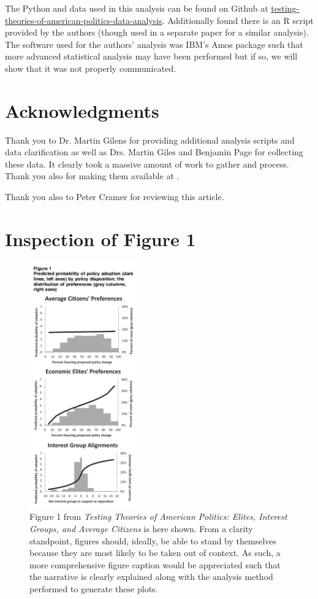 \documentclass[]{article}
\begin{document}
The Python and data used in this analysis can be found on Github at \href{https://github.com/ChemistryMickey/testing-theories-of-american-politics-data-analysis}{testing-theories-of-american-politics-data-analysis}. Additionally found there is an R script provided by the authors (though used in a separate paper for a similar analysis). The software used for the authors' analysis was IBM's Amos package such that more advanced statistical analysis may have been performed but if so, we will show that it was not properly communicated.

\section{Acknowledgments}
Thank you to Dr. Martin Gilens for providing additional analysis scripts and data clarification as well as Drs. Martin Giles and Benjamin Page for collecting these data. 
It clearly took a massive amount of work to gather and process.
Thank you also for making them available at \cite{gilens}.

Thank you also to Peter Cramer for reviewing this article.

\section{Inspection of Figure 1}

\begin{figure}[H]
	\begin{center}
		\includegraphics[height=400px]{./figures/figure1.png}
	\end{center}	
	\caption{Figure 1 from \textit{Testing Theories of American Politics: Elites, Interest Groups, and Average Citizens} is here shown. From a clarity standpoint, figures should, ideally, be able to stand by themselves because they are most likely to be taken out of context. As such, a more comprehensive figure caption would be appreciated such that the narrative is clearly explained along with the analysis method performed to generate these plots.}
	\label{paper_figure1}
\end{figure}
\end{document}
